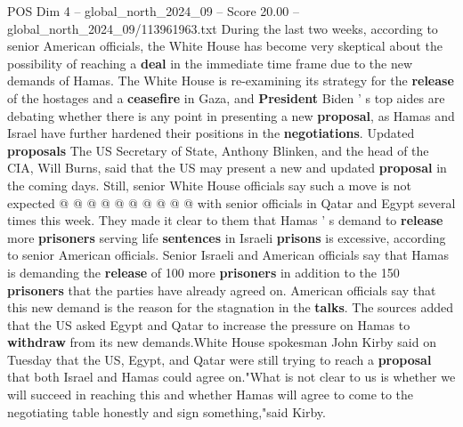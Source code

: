 \begin{textsample}{POS Dim 4 – global\_north\_2024\_09 – Score 20.00 – global\_north\_2024\_09/113961963.txt}
During the last two weeks, according to senior American officials, the White House has become very skeptical about the possibility of reaching a \textbf{deal} in the immediate time frame due to the new demands of Hamas.
The White House is re-examining its strategy for the \textbf{release} of the hostages and a \textbf{ceasefire} in Gaza, and \textbf{President} Biden ' s top aides are debating whether there is any point in presenting a new \textbf{proposal}, as Hamas and Israel have further hardened their positions in the \textbf{negotiations}.
Updated \textbf{proposals} The US Secretary of State, Anthony Blinken, and the head of the CIA, Will Burns, said that the US may present a new and updated \textbf{proposal} in the coming days.
Still, senior White House officials say such a move is not expected @ @ @ @ @ @ @ @ @ @ with senior officials in Qatar and Egypt several times this week.
They made it clear to them that Hamas ' s demand to \textbf{release} more \textbf{prisoners} serving life \textbf{sentences} in Israeli \textbf{prisons} is excessive, according to senior American officials.
Senior Israeli and American officials say that Hamas is demanding the \textbf{release} of 100 more \textbf{prisoners} in addition to the 150 \textbf{prisoners} that the parties have already agreed on.
American officials say that this new demand is the reason for the stagnation in the \textbf{talks}.
The sources added that the US asked Egypt and Qatar to increase the pressure on Hamas to \textbf{withdraw} from its new demands.White House spokesman John Kirby said on Tuesday that the US, Egypt, and Qatar were still trying to reach a \textbf{proposal} that both Israel and Hamas could agree on."What is not clear to us is whether we will succeed in reaching this and whether Hamas will agree to come to the negotiating table honestly and sign something,"said Kirby.

\end{textsample}
